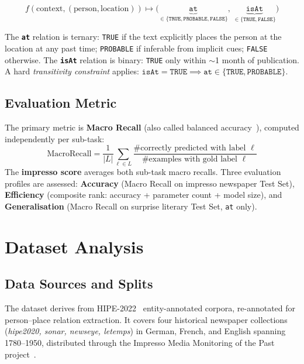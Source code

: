 \documentclass{ceurart}
\begin{document}
\begin{equation}
  f(\text{context}, (\text{person}, \text{location})) \mapsto \Big(\underbrace{\texttt{at}}_{\in\{\texttt{TRUE},\texttt{PROBABLE},\texttt{FALSE}\}},\ \underbrace{\texttt{isAt}}_{\in\{\texttt{TRUE},\texttt{FALSE}\}}\Big)
\end{equation}

The \textbf{\texttt{at}} relation is ternary: \texttt{TRUE} if the text explicitly places the person at the location at any past time; \texttt{PROBABLE} if inferable from implicit cues; \texttt{FALSE} otherwise. The \textbf{\texttt{isAt}} relation is binary: \texttt{TRUE} only within $\sim$1 month of publication. A hard \emph{transitivity constraint} applies: $\texttt{isAt}=\texttt{TRUE} \implies \texttt{at} \in \{\texttt{TRUE},\texttt{PROBABLE}\}$.

\subsection{Evaluation Metric}

The primary metric is \textbf{Macro Recall} (also called balanced accuracy~\cite{opitz2024macrorecall}), computed independently per sub-task:
\begin{equation}
  \mathrm{MacroRecall} = \frac{1}{|L|}\sum_{\ell \in L} \frac{\#\text{correctly predicted with label }\ell}{\#\text{examples with gold label }\ell}
\end{equation}
The \textbf{impresso score} averages both sub-task macro recalls. Three evaluation profiles are assessed: \textbf{Accuracy} (Macro Recall on impresso newspaper Test Set), \textbf{Efficiency} (composite rank: accuracy + parameter count + model size), and \textbf{Generalisation} (Macro Recall on surprise literary Test Set, \texttt{at} only).

\section{Dataset Analysis}
\label{sec:data}

\subsection{Data Sources and Splits}

The dataset derives from HIPE-2022~\cite{hipe2022} entity-annotated corpora, re-annotated for person--place relation extraction. It covers four historical newspaper collections (\textit{hipe2020, sonar, newseye, letemps}) in German, French, and English spanning 1780--1950, distributed through the Impresso Media Monitoring of the Past project~\cite{impresso}.
\end{document}
